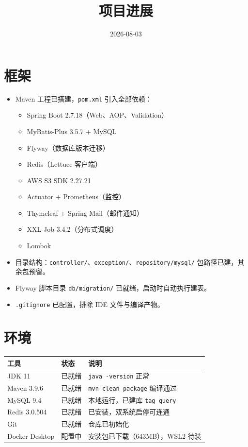 \documentclass[12pt,a4paper]{ctexart}
\title{\textbf{项目进展}}
\author{2026-08-03}
\date{}
\begin{document}
\maketitle

\section{框架}

\begin{itemize}
\item Maven 工程已搭建，\texttt{pom.xml} 引入全部依赖：
  \begin{itemize}
  \item Spring Boot 2.7.18（Web、AOP、Validation）
  \item MyBatis-Plus 3.5.7 + MySQL
  \item Flyway（数据库版本迁移）
  \item Redis（Lettuce 客户端）
  \item AWS S3 SDK 2.27.21
  \item Actuator + Prometheus（监控）
  \item Thymeleaf + Spring Mail（邮件通知）
  \item XXL-Job 3.4.2（分布式调度）
  \item Lombok
  \end{itemize}
\item 目录结构：\texttt{controller/}、\texttt{exception/}、\texttt{repository/mysql/} 包路径已建，其余包预留。
\item Flyway 脚本目录 \texttt{db/migration/} 已就绪，启动时自动执行建表。
\item \texttt{.gitignore} 已配置，排除 IDE 文件与编译产物。
\end{itemize}

\section{环境}

\begin{table}[h]
\centering
\begin{tabular}{lll}
\toprule
工具 & 状态 & 说明 \\
\midrule
JDK 11 & 已就绪 & \texttt{java -version} 正常 \\
Maven 3.9.6 & 已就绪 & \texttt{mvn clean package} 编译通过 \\
MySQL 9.4 & 已就绪 & 本地运行，已建库 \texttt{tag\_query} \\
Redis 3.0.504 & 已就绪 & 已安装，双系统启停可连通 \\
Git & 已就绪 & 仓库已初始化 \\
Docker Desktop & 配置中 & 安装包已下载（643MB），WSL2 待装 \\
\bottomrule
\end{tabular}
\end{table}
\end{document}
